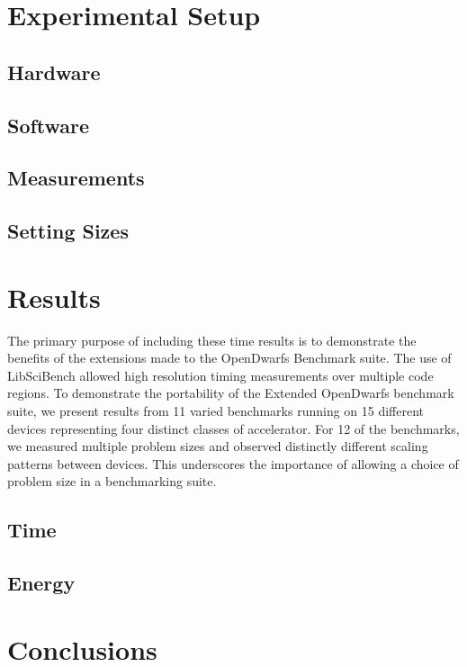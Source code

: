 \documentclass[sigconf]{acmart}
\begin{document}
\section{Experimental Setup}\label{sec:experimental_setup}
\subsection{Hardware}
\subsection{Software}
\subsection{Measurements}
\subsection{Setting Sizes}

\section{Results}\label{sec:results}

The primary purpose of including these time results is to demonstrate the benefits of the extensions made to the OpenDwarfs Benchmark suite.
The use of LibSciBench allowed high resolution timing measurements over multiple code regions.
To demonstrate the portability of the Extended OpenDwarfs benchmark suite, we present results from 11 varied benchmarks running on 15 different devices representing four distinct classes of accelerator.
For 12 of the benchmarks, we measured multiple problem sizes and observed distinctly different scaling patterns between devices.
This underscores the importance of allowing a choice of problem size in a benchmarking suite.

\subsection{Time}
\subsection{Energy}


\section{Conclusions}
\end{document}
